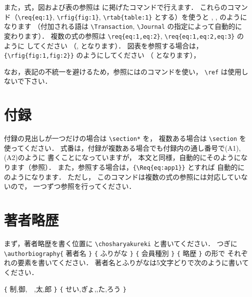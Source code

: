 \documentclass[J]{scitrans}
\begin{document}
また，式，図および表の参照は {} に掲げたコマンドで行えます．
これらのコマンド（\verb+\req{eq:1}+, \verb+\rfig{fig:1}+,
\verb+\rtab{table:1}+ とする）を使うと {}, {},
{} のようになります
（付加される語は \verb+\Transaction+, \verb+\Journal+ の指定によって自動的に
変わります）．
複数の式の参照は \verb+\req{eq:1,eq:2}+,
\verb+\req{eq:1,eq:2,eq:3}+ のように
してください
（{},
{} となります）．
図表を参照する場合は，
\verb+{\rfig{fig:1,fig:2}}+
のようにしてください
（{} となります），

なお，表記の不統一を避けるため，参照にはのコマンドを使い，
\verb+\ref+ は使用しないで下さい．

\section{付録}

付録の見出しが一つだけの場合は \verb+\section*+ を，
複数ある場合は \verb+\section+ を使ってください．
式番は，付録が複数ある場合でも付録内の通し番号で(A1), (A2)のように
書くことになっていますが，
本文と同様，自動的にそのようになります（参照）．
また，参照する場合は，\verb+{\Req{eq:app1}}+ とすれば
自動的に {} のようになります．
ただし，
このコマンドは複数の式の参照には対応していないので，
一つずつ参照を行ってください．


\section{著者略歴}
\label{subsec:aautobiography}

まず，著者略歴を書く位置に \verb+\chosharyakureki+ と書いてください．
つぎに \verb+\authorbiography{+ 著者名 \verb+}+ \verb+{+ ふりがな \verb+}+
\verb+{+ 会員種別 \verb+}+ \verb+{+ 略歴 \verb+}+ の形で
それぞれの要素を書いてください．
著者名とふりがなは5文字どりで次のように書いてください．

\verb+{+ 制,御,　,太,郎 \verb+}+ \verb+{+ せい,ぎょ,,た,ろう \verb+}+
\end{document}
